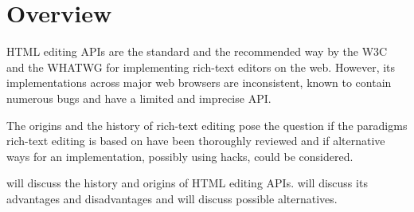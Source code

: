 \chapter{Overview}





HTML editing APIs are the standard and the recommended way by the W3C and the WHATWG for implementing rich-text editors on the web. However, its implementations across major web browsers are inconsistent, known to contain numerous bugs and have a limited and imprecise API.

The origins and the history of rich-text editing pose the question if the paradigms rich-text editing is based on have been thoroughly reviewed and if alternative ways for an implementation, possibly using hacks, could be considered.

 will discuss the history and origins of HTML editing APIs.  will discuss its advantages and disadvantages and
 will discuss possible alternatives.






